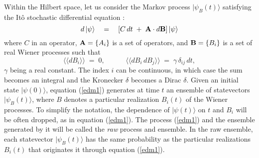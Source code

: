 \documentclass[12pt]{article}
\newcommand{\llangle}{\langle\!\langle}
\newcommand{\rrangle}{\rangle\!\rangle}
\begin{document}
Within the Hilbert space, let us consider the Markov process
$|\psi_{B}(t)\rangle$ satisfying the It\^o stochastic differential
equation \cite{arn}:
\begin{equation} \label{edm1}
d\,|\psi\rangle \quad = \quad \left[C\, dt \; + \; {\bf A}\cdot
d{\bf B} \right]|\psi\rangle
\end{equation}
where $C$ in an operator, ${\bf A} = \{A_{i}\}$ is a set of
operators, and ${\bf B} = \{B_{i}\}$ is a set of real Wiener
processes such that
\begin{equation}
\llangle dB_{i} \rrangle \; = \; 0, \qquad \quad \llangle dB_{i}\,
dB_{j} \rrangle \; = \; \gamma\,\delta_{ij}\,dt,
\end{equation}
$\gamma$ being a real constant. The index $i$ can be continuous,
in which case the sum becomes an integral and the Kronecker
$\delta$ becomes a Dirac $\delta$. Given an initial state
$|\psi(0)\rangle$, equation (\ref{edm1}) generates at time $t$ an
ensemble of statevectors $|\psi_{B}(t)\rangle$, where $B$ denotes
a particular realization $B_{i}(t)$ of the Wiener processes. To
simplify the notation, the dependence of $|\psi(t)\rangle$ on $t$
and $B_{i}$ will be often dropped, as in equation (\ref{edm1}).
The process (\ref{edm1}) and the ensemble generated by it will be
called the {\it raw} process and ensemble. In the raw ensemble,
each statevector $|\psi_{B}(t)\rangle$ has the same probability as
the particular realizations $B_{i}(t)$ that originates it through
equation (\ref{edm1}).
\end{document}
